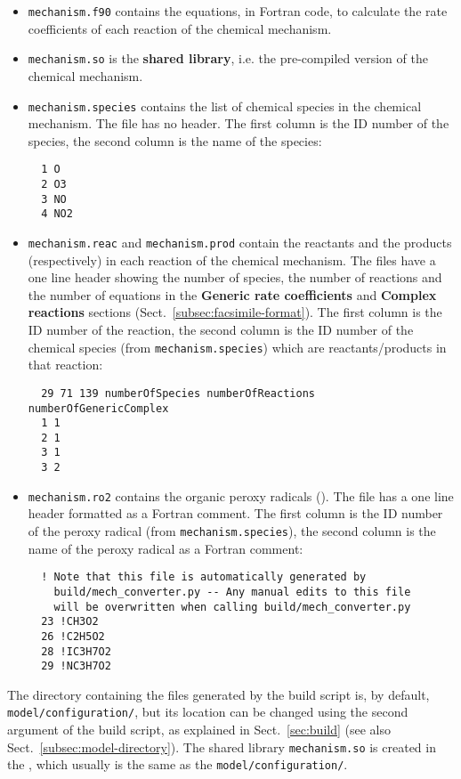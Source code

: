 \begin{itemize}
\item \texttt{mechanism.f90} contains the equations, in Fortran code,
  to calculate the rate coefficients of each reaction of the chemical
  mechanism.
\item \texttt{mechanism.so} is the \textbf{shared library}, i.e. the
  pre-compiled version of the chemical mechanism.
\item \texttt{mechanism.species} contains the list of chemical species
  in the chemical mechanism. The file has no header. The first column
  is the ID number of the species, the second column is the
  name of the species:
  \begin{verbatim}
  1 O
  2 O3
  3 NO
  4 NO2
  \end{verbatim}
\item \texttt{mechanism.reac} and \texttt{mechanism.prod} contain the
  reactants and the products (respectively) in each reaction of the
  chemical mechanism. The files have a one line header showing the
  number of species, the number of reactions and the number of
  equations in the \textbf{Generic rate coefficients} and
  \textbf{Complex reactions} sections (Sect.~\ref{subsec:facsimile-format}).
  The first column is the ID number of the reaction, the second
  column is the ID number of the chemical species (from
  \texttt{mechanism.species}) which are reactants/products in that
  reaction:
  \begin{verbatim}
  29 71 139 numberOfSpecies numberOfReactions numberOfGenericComplex
  1 1
  2 1
  3 1
  3 2
  \end{verbatim}
\item \texttt{mechanism.ro2} contains the organic peroxy radicals
  (). The file has a one line header formatted as a Fortran
  comment. The first column is the ID number of the peroxy
  radical (from \texttt{mechanism.species}), the second column is the
  name of the peroxy radical as a Fortran comment:
  \begin{verbatim}
  ! Note that this file is automatically generated by
    build/mech_converter.py -- Any manual edits to this file
    will be overwritten when calling build/mech_converter.py
  23 !CH3O2
  26 !C2H5O2
  28 !IC3H7O2
  29 !NC3H7O2
  \end{verbatim}
\end{itemize}

The directory containing the files generated by the build script is,
by default, \texttt{model/configuration/}, but its location can be
changed using the second argument of the build script, as explained in
Sect.~\ref{sec:build} (see also Sect.~\ref{subsec:model-directory}).
The shared library \texttt{mechanism.so} is created in the \sharedir,
which usually is the same as the \texttt{model/configuration/}.

